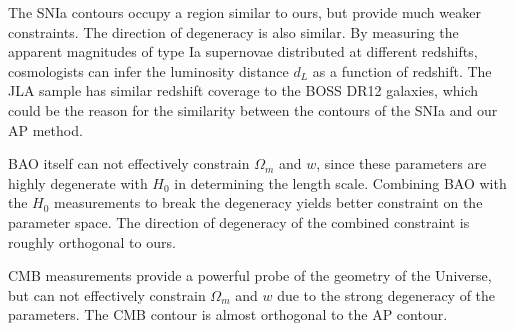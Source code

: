 \documentclass[iop]{emulateapj}
\begin{document}
%
The SNIa contours occupy a region similar to ours, but provide much weaker constraints. %
The direction of degeneracy is also similar.
By measuring the apparent magnitudes of type Ia supernovae distributed at different redshifts, 
 cosmologists can infer the luminosity distance $d_L$ as a function of redshift.
The JLA sample has similar redshift coverage to the BOSS DR12 galaxies,
which could be the reason for the similarity between the contours of the SNIa and our AP method.



BAO itself can not effectively constrain $\Omega_m$ and $w$, 
since these parameters are highly degenerate with $H_0$ in determining the length scale.
Combining BAO with the $H_0$ measurements to break the degeneracy yields better constraint on the parameter space.
The direction of degeneracy of the combined constraint is roughly orthogonal to ours.

CMB measurements provide a powerful probe of the geometry of the Universe,
but can not effectively constrain $\Omega_m$ and $w$ due to the strong degeneracy of the parameters.
The CMB contour is almost orthogonal to the AP contour. 
\end{document}
